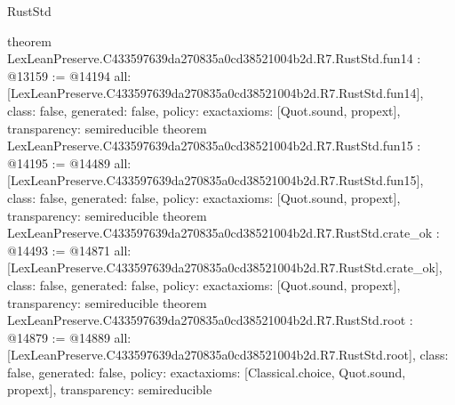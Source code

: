 \begin{lexlean}{RustStd}
\begin{coremodule}
{}
theorem LexLeanPreserve.C433597639da270835a0cd38521004b2d.R7.RustStd.fun14 : @13159 := @14194 {
  all: [LexLeanPreserve.C433597639da270835a0cd38521004b2d.R7.RustStd.fun14],
  class: false,
  generated: false,
  policy: exact{axioms: [Quot.sound, propext]},
  transparency: semireducible
}
theorem LexLeanPreserve.C433597639da270835a0cd38521004b2d.R7.RustStd.fun15 : @14195 := @14489 {
  all: [LexLeanPreserve.C433597639da270835a0cd38521004b2d.R7.RustStd.fun15],
  class: false,
  generated: false,
  policy: exact{axioms: [Quot.sound, propext]},
  transparency: semireducible
}
theorem LexLeanPreserve.C433597639da270835a0cd38521004b2d.R7.RustStd.crate_ok : @14493 := @14871 {
  all: [LexLeanPreserve.C433597639da270835a0cd38521004b2d.R7.RustStd.crate_ok],
  class: false,
  generated: false,
  policy: exact{axioms: [Quot.sound, propext]},
  transparency: semireducible
}
theorem LexLeanPreserve.C433597639da270835a0cd38521004b2d.R7.RustStd.root : @14879 := @14889 {
  all: [LexLeanPreserve.C433597639da270835a0cd38521004b2d.R7.RustStd.root],
  class: false,
  generated: false,
  policy: exact{axioms: [Classical.choice, Quot.sound, propext]},
  transparency: semireducible
}


\end{coremodule}
\end{lexlean}
